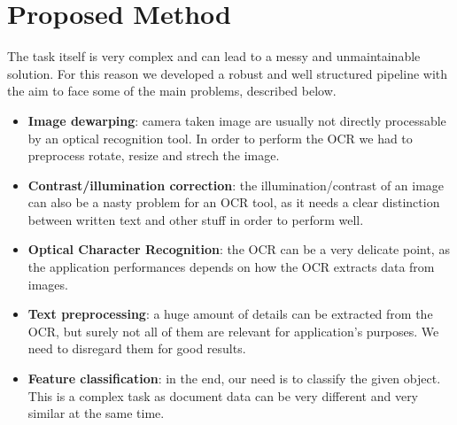\documentclass[10pt,twocolumn,letterpaper]{article}
\begin{document}
\section{Proposed Method}
\label{sec:proposed-method}

The task itself is very complex and can lead to a messy and
unmaintainable solution. For this reason we developed a robust and well
structured pipeline with the aim to face some of the main problems,
described below.

\begin{itemize}
  \item \textbf{Image dewarping}: camera taken image are usually not directly
    processable by an optical recognition tool. In order to perform
    the OCR we had to preprocess rotate, resize and
    strech the image.
  \item \textbf{Contrast/illumination correction}: the
    illumination/contrast of an image can also be a nasty problem for an
    OCR tool, as it needs a clear distinction between written text and other
    stuff in order to perform well.
  \item \textbf{Optical Character Recognition}: the OCR can be a very delicate
    point, as the application performances depends on how the OCR
    extracts data from images.
  \item \textbf{Text preprocessing}: a huge amount of details can be extracted
    from the OCR, but surely not all of them are relevant for
    application's purposes. We need to disregard them for good results.
  \item \textbf{Feature classification}: in the end, our need is to classify
    the given object. This is a complex task as document data can be
    very different and very similar at the same time.
\end{itemize}
\end{document}
